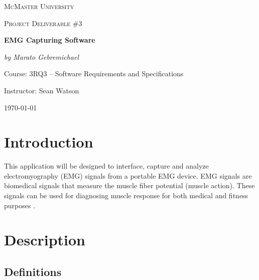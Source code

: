 \documentclass[12pt,a4paper]{article}
\begin{document}
\begin{titlepage}
	\centering
	{\scshape\LARGE McMaster University \par}
	\vspace{2cm}
	{\scshape\Large Project Deliverable \#3 \par}
	\vspace{4cm}
	{\huge\bfseries EMG Capturing Software\par}
	\vspace{2cm}
	{\Large\itshape by Marato Gebremichael\par}
	
	\vfill
	Course: 3RQ3 – Software Requirements and Specifications\par
    Instructor: Sean Watson

	\vfill

	{\large \today\par}
\end{titlepage}

\tableofcontents

\newpage

\listoftables

\listoffigures

\newpage

\section{Introduction}

\indent This application will be designed to interface, capture and analyze electromyography (EMG) signals from a portable EMG device. 
EMG signals are biomedical signals that measure the muscle fiber potential (muscle action). 
These signals can be used for diagnosing muscle response for both medical and fitness purposes \cite{Mayo Clinic}.

\section{Description}

\subsection{Definitions}
\end{document}
